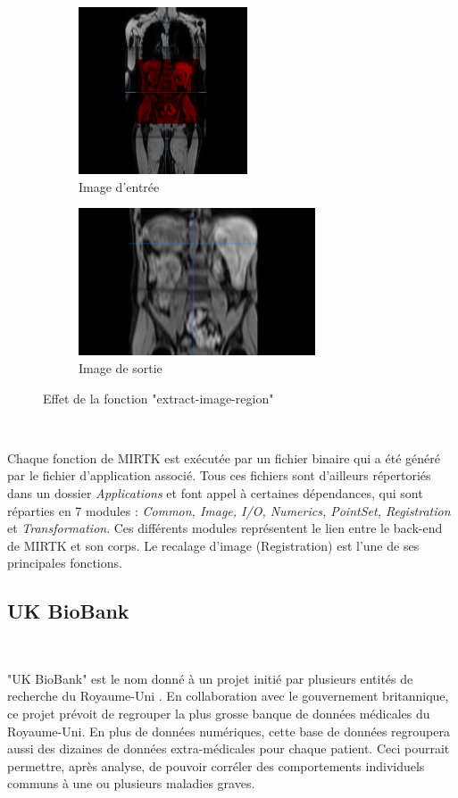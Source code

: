 \documentclass[10pt]{report}
\begin{document}
	\begin{figure}[h!]
		\centering
		\begin{subfigure}{.5\textwidth}
			\centering
			\includegraphics[width=5cm]{Reports/figures/mirtkextractregion1d.png}
			\caption{Image d'entrée}
			\label{Image d'entrée}
		\end{subfigure}%
		\begin{subfigure}{.5\textwidth}
			\centering
			\includegraphics[width=7cm]{Reports/figures/mirtkextractregion2_1d.png}
			\caption{Image de sortie}
			\label{Image de sortie}
		\end{subfigure}
		\caption{Effet de la fonction "extract-image-region"}
		\label{Effet de la fonction "extract-image-region"}
	\end{figure}~\par
	
	Chaque fonction de MIRTK est exécutée par un fichier binaire qui a été généré par le fichier d'application associé. Tous ces fichiers sont d'ailleurs répertoriés dans un dossier \textit{Applications} et font appel à certaines dépendances, qui sont réparties en 7 modules : \textit{Common, Image, I/O, Numerics, PointSet, Registration} et \textit{Transformation}. Ces différents modules représentent le lien entre le back-end de MIRTK et son corps. Le recalage d'image (Registration) est l'une de ses principales fonctions.
	
	 \subsection{UK BioBank}~\par
	 "UK BioBank" est le nom donné à un projet initié par plusieurs entités de recherche du Royaume-Uni . En collaboration avec le gouvernement britannique, ce projet prévoit de regrouper la plus grosse banque de données médicales du Royaume-Uni. En plus de données numériques, cette base de données regroupera aussi des dizaines de données extra-médicales pour chaque patient. Ceci pourrait permettre, après analyse, de pouvoir corréler des comportements individuels communs à une ou plusieurs maladies graves. ~\par~\par
	 
\end{document}
